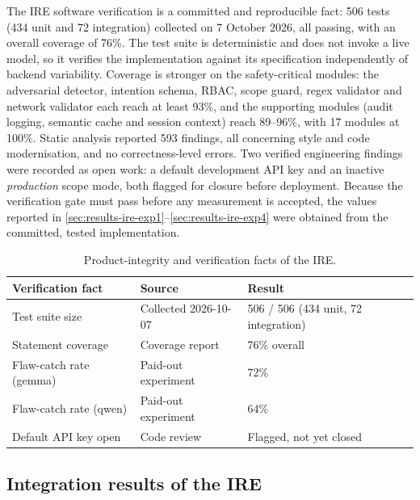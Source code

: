 The IRE software verification is a committed and reproducible fact: 506 tests
(434 unit and 72 integration) collected on 7 October 2026, all passing, with an
overall coverage of 76\%. The test suite is deterministic and does not invoke a
live model, so it verifies the implementation against its specification
independently of backend variability. Coverage is stronger on the safety-critical
modules: the adversarial detector, intention schema, RBAC, scope guard, regex
validator and network validator each reach at least 93\%, and the supporting
modules (audit logging, semantic cache and session context) reach 89--96\%, with
17 modules at 100\%. Static analysis reported 593 findings, all concerning style
and code modernisation, and no correctness-level errors. Two verified
engineering findings were recorded as open work: a default development API key
and an inactive \emph{production} scope mode, both flagged for closure before
deployment. Because the verification gate must pass before any measurement is
accepted, the values reported in \cref{sec:results-ire-exp1}--\cref{sec:results-ire-exp4}
were obtained from the committed, tested implementation.

\begin{table}[htbp]
  \centering
  \begin{tabular}{@{}p{}p{}p{}@{}}
    \toprule
    \textbf{Verification fact} & \textbf{Source} & \textbf{Result}\\
    \midrule
    Test suite size & Collected 2026-10-07 & 506 / 506 (434 unit, 72 integration)\\
    Statement coverage & Coverage report & 76\% overall\\
    Flaw-catch rate (gemma) & Paid-out experiment & 72\%\\
    Flaw-catch rate (qwen) & Paid-out experiment & 64\%\\
    Default API key open & Code review & Flagged, not yet closed\\
    \bottomrule
  \end{tabular}
  \caption{Product-integrity and verification facts of the IRE.}\label{tab:ire-integrity}
\end{table}

\subsection{Integration results of the IRE}\label{sec:results-ire-integration}

